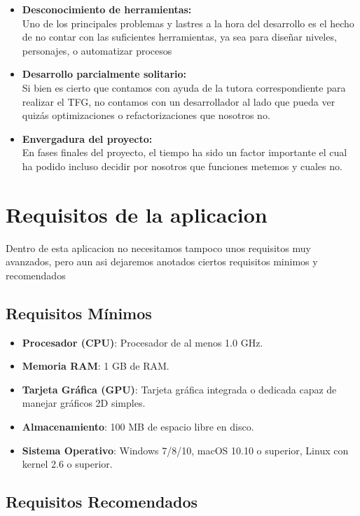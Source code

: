 \documentclass[a4paper]{article}
\begin{document}
\begin{itemize}
    \item \textbf{Desconocimiento de herramientas:} \\
          Uno de los principales problemas y lastres a la hora del desarrollo es el hecho de no contar con las suficientes herramientas, ya sea para diseñar niveles, personajes, o automatizar procesos

    \item \textbf{Desarrollo parcialmente solitario:} \\
          Si bien es cierto que contamos con ayuda de la tutora correspondiente para realizar el TFG, no contamos con un desarrollador al lado que pueda ver quizás optimizaciones o refactorizaciones que nosotros no.

    \item \textbf{Envergadura del proyecto:}\\
          En fases finales del proyecto, el tiempo ha sido un factor importante el cual ha podido incluso decidir por nosotros que funciones metemos y cuales no.
\end{itemize}


\clearpage
\section{Requisitos de la aplicacion}
Dentro de esta aplicacion no necesitamos tampoco unos requisitos muy avanzados, pero aun asi dejaremos anotados ciertos requisitos minimos y recomendados
\subsection{Requisitos Mínimos}

\begin{itemize}
    \item \textbf{Procesador (CPU)}: Procesador de al menos 1.0 GHz.
    \item \textbf{Memoria RAM}: 1 GB de RAM.
    \item \textbf{Tarjeta Gráfica (GPU)}: Tarjeta gráfica integrada o dedicada capaz de manejar gráficos 2D simples.
    \item \textbf{Almacenamiento}: 100 MB de espacio libre en disco.
    \item \textbf{Sistema Operativo}: Windows 7/8/10, macOS 10.10 o superior, Linux con kernel 2.6 o superior.
\end{itemize}

\subsection{Requisitos Recomendados}
\end{document}
